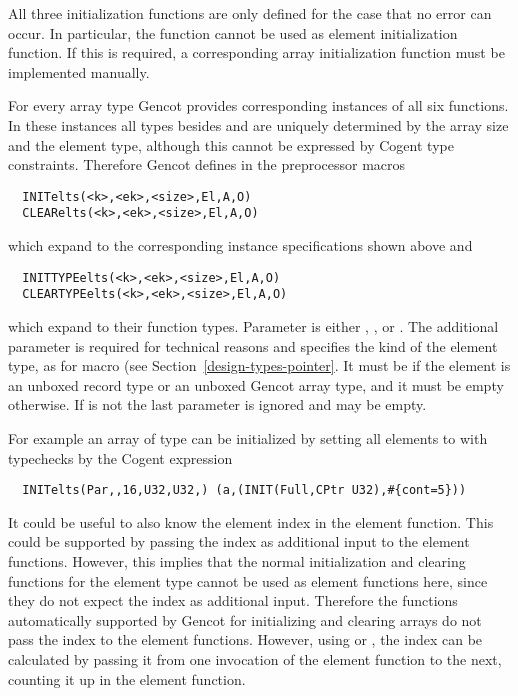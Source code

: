 All three initialization functions are only defined for the case that no error can occur. In particular, the function
 cannot be used as element initialization function. If this is required, a corresponding array initialization
function must be implemented manually.

For every array type  Gencot provides corresponding instances of all six functions.
In these instances all types besides  and  are uniquely determined by the array size and the element type, although
this cannot be expressed by Cogent type constraints. Therefore Gencot defines in 
the preprocessor macros
\begin{verbatim}
  INITelts(<k>,<ek>,<size>,El,A,O)
  CLEARelts(<k>,<ek>,<size>,El,A,O)
\end{verbatim}
which expand to the corresponding instance specifications shown above and
\begin{verbatim}
  INITTYPEelts(<k>,<ek>,<size>,El,A,O)
  CLEARTYPEelts(<k>,<ek>,<size>,El,A,O)
\end{verbatim}
which expand to their function types. Parameter  is either , , 
or . The additional parameter  is required for technical reasons and specifies the
kind of the element type, as for macro  (see Section~\ref{design-types-pointer}. 
It must be  if the element is an unboxed record type or an unboxed Gencot array type, and it
must be empty otherwise. If  is not  the last parameter  is ignored and may be empty.

For example an array  of type  can be initialized by setting all elements to  
with typechecks by the Cogent expression
\begin{verbatim}
  INITelts(Par,,16,U32,U32,) (a,(INIT(Full,CPtr U32),#{cont=5}))
\end{verbatim}

It could be useful to also know the element index in the element function. This could be supported by passing the index
as additional input to the element functions. However, this implies that the normal initialization and clearing functions
for the element type cannot be used as element functions here, since they do not expect the index as additional input.
Therefore the functions automatically supported by Gencot for initializing and clearing arrays do not pass the index 
to the element functions. However, using  or , the index can be calculated by
passing it from one invocation of the element function to the next, counting it up in the element function.

